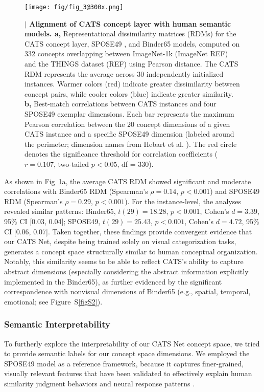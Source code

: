 \documentclass[pdflatex,sn-mathphys-num,lineno]{sn-jnl}%
\begin{document}
\begin{CJK}{UTF8}{gbsn}
\begin{figure}[htbp]
\centering
\texttt{[image: fig/fig\_3@300x.png]}
\caption{\textbf{$\vert$ Alignment of CATS concept layer with human semantic models. a,} Representational dissimilarity matrices (RDMs) for the CATS concept layer, SPOSE49 \cite{hebart_revealing_2020}, and Binder65 \cite{binder_toward_2016} models, computed on 332 concepts overlapping between ImageNet-1k (ImageNet REF) and the THINGS dataset (REF) using Pearson distance. The CATS RDM represents the average across 30 independently initialized instances. Warmer colors (red) indicate greater dissimilarity between concept pairs, while cooler colors (blue) indicate greater similarity. \textbf{b,} Best-match correlations between CATS instances and four SPOSE49 exemplar dimensions. Each bar represents the maximum Pearson correlation between the 20 concept dimensions of a given CATS instance and a specific SPOSE49 dimension (labeled around the perimeter; dimension names from Hebart et al. \cite{hebart_revealing_2020}). The red circle denotes the significance threshold for correlation coefficients ($r = 0.107$, two-tailed $p < 0.05$, df = 330).}
\label{fig3}
\end{figure}

As shown in Fig~\ref{fig3}a, the average CATS RDM showed significant and moderate correlations with Binder65 RDM (Spearman’s $\rho = 0.14$, $p < 0.001$) and SPOSE49 RDM (Spearman’s $\rho = 0.29$, $p < 0.001$). For the instance-level, the analyses revealed similar patterns: Binder65, $t(29) = 18.28$, $p < 0.001$, Cohen’s $d = 3.39$, 95\% CI [0.03, 0.04]; SPOSE49, $t(29) = 25.43$, $p < 0.001$, Cohen’s $d = 4.72$, 95\% CI [0.06, 0.07]. Taken together, these findings provide convergent evidence that our CATS Net, despite being trained solely on visual categorization tasks, generates a concept space structurally similar to human conceptual organization. Notably, this similarity seems to be able to reflect CATS’s ability to capture abstract dimensions (especially considering the abstract information explicitly implemented in the Binder65), as further evidenced by the significant correspondence with nonvisual dimensions of Binder65 (e.g., spatial, temporal, emotional; see Figure~S\ref{figS2}). 

\subsubsection{Semantic Interpretability}
To furtherly explore the interpretability of our CATS Net concept space, we tried to provide semantic labels for our concept space dimensions. We employed the SPOSE49 model as a reference framework, because it captures finer-grained, visually relevant features that have been validated to effectively explain human similarity judgment behaviors \cite{hebart_revealing_2020} and neural response patterns \cite{contier_distributed_2024}. 


\end{CJK}
\end{document}
